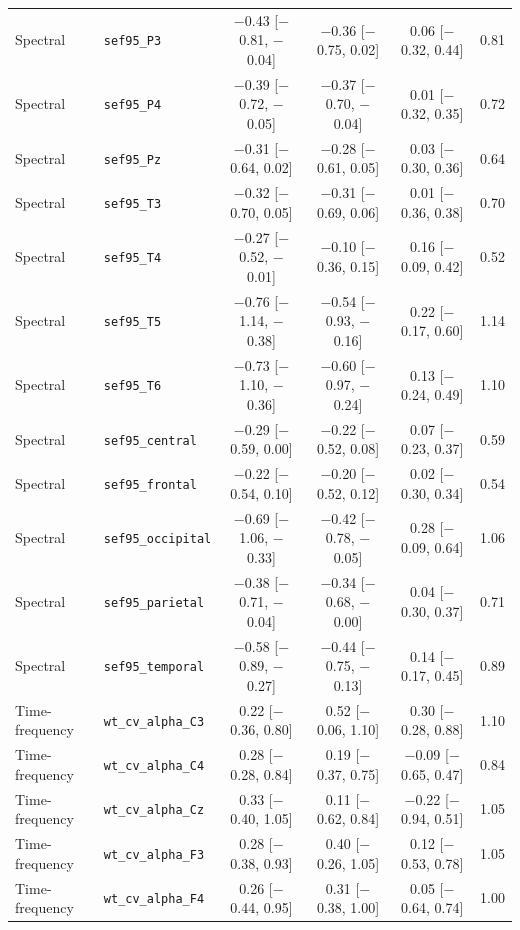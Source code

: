 {\begin{longtable}{llcccc}
Spectral & \texttt{sef95\_P3} & $-$0.43 [$-$0.81, $-$0.04] & $-$0.36 [$-$0.75, 0.02] & 0.06 [$-$0.32, 0.44] & 0.81 \\
Spectral & \texttt{sef95\_P4} & $-$0.39 [$-$0.72, $-$0.05] & $-$0.37 [$-$0.70, $-$0.04] & 0.01 [$-$0.32, 0.35] & 0.72 \\
Spectral & \texttt{sef95\_Pz} & $-$0.31 [$-$0.64, 0.02] & $-$0.28 [$-$0.61, 0.05] & 0.03 [$-$0.30, 0.36] & 0.64 \\
Spectral & \texttt{sef95\_T3} & $-$0.32 [$-$0.70, 0.05] & $-$0.31 [$-$0.69, 0.06] & 0.01 [$-$0.36, 0.38] & 0.70 \\
Spectral & \texttt{sef95\_T4} & $-$0.27 [$-$0.52, $-$0.01] & $-$0.10 [$-$0.36, 0.15] & 0.16 [$-$0.09, 0.42] & 0.52 \\
Spectral & \texttt{sef95\_T5} & $-$0.76 [$-$1.14, $-$0.38] & $-$0.54 [$-$0.93, $-$0.16] & 0.22 [$-$0.17, 0.60] & 1.14 \\
Spectral & \texttt{sef95\_T6} & $-$0.73 [$-$1.10, $-$0.36] & $-$0.60 [$-$0.97, $-$0.24] & 0.13 [$-$0.24, 0.49] & 1.10 \\
Spectral & \texttt{sef95\_central} & $-$0.29 [$-$0.59, 0.00] & $-$0.22 [$-$0.52, 0.08] & 0.07 [$-$0.23, 0.37] & 0.59 \\
Spectral & \texttt{sef95\_frontal} & $-$0.22 [$-$0.54, 0.10] & $-$0.20 [$-$0.52, 0.12] & 0.02 [$-$0.30, 0.34] & 0.54 \\
Spectral & \texttt{sef95\_occipital} & $-$0.69 [$-$1.06, $-$0.33] & $-$0.42 [$-$0.78, $-$0.05] & 0.28 [$-$0.09, 0.64] & 1.06 \\
Spectral & \texttt{sef95\_parietal} & $-$0.38 [$-$0.71, $-$0.04] & $-$0.34 [$-$0.68, $-$0.00] & 0.04 [$-$0.30, 0.37] & 0.71 \\
Spectral & \texttt{sef95\_temporal} & $-$0.58 [$-$0.89, $-$0.27] & $-$0.44 [$-$0.75, $-$0.13] & 0.14 [$-$0.17, 0.45] & 0.89 \\
Time-frequency & \texttt{wt\_cv\_alpha\_C3} & 0.22 [$-$0.36, 0.80] & 0.52 [$-$0.06, 1.10] & 0.30 [$-$0.28, 0.88] & 1.10 \\
Time-frequency & \texttt{wt\_cv\_alpha\_C4} & 0.28 [$-$0.28, 0.84] & 0.19 [$-$0.37, 0.75] & $-$0.09 [$-$0.65, 0.47] & 0.84 \\
Time-frequency & \texttt{wt\_cv\_alpha\_Cz} & 0.33 [$-$0.40, 1.05] & 0.11 [$-$0.62, 0.84] & $-$0.22 [$-$0.94, 0.51] & 1.05 \\
Time-frequency & \texttt{wt\_cv\_alpha\_F3} & 0.28 [$-$0.38, 0.93] & 0.40 [$-$0.26, 1.05] & 0.12 [$-$0.53, 0.78] & 1.05 \\
Time-frequency & \texttt{wt\_cv\_alpha\_F4} & 0.26 [$-$0.44, 0.95] & 0.31 [$-$0.38, 1.00] & 0.05 [$-$0.64, 0.74] & 1.00 \\

\end{longtable}}
